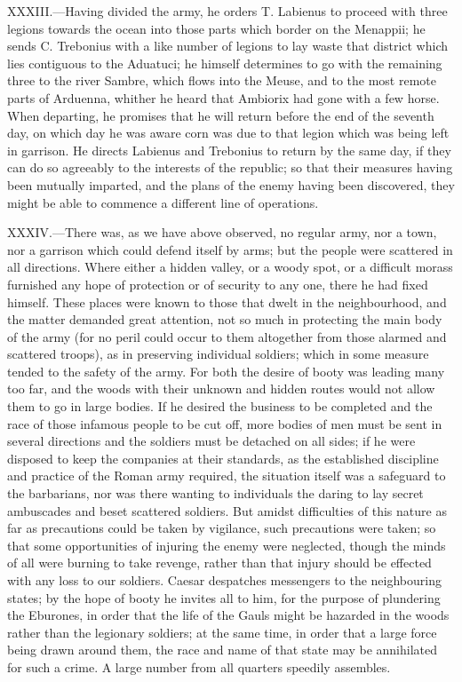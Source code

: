XXXIII.—Having divided the army, he orders T. Labienus to proceed with
three legions towards the ocean into those parts which border on the
Menappii; he sends C. Trebonius with a like number of legions to lay
waste that district which lies contiguous to the Aduatuci; he himself
determines to go with the remaining three to the river Sambre, which
flows into the Meuse, and to the most remote parts of Arduenna, whither
he heard that Ambiorix had gone with a few horse. When departing, he
promises that he will return before the end of the seventh day, on which
day he was aware corn was due to that legion which was being left in
garrison. He directs Labienus and Trebonius to return by the same day,
if they can do so agreeably to the interests of the republic; so that
their measures having been mutually imparted, and the plans of the enemy
having been discovered, they might be able to commence a different line
of operations.

XXXIV.—There was, as we have above observed, no regular army, nor a
town, nor a garrison which could defend itself by arms; but the people
were scattered in all directions. Where either a hidden valley, or a
woody spot, or a difficult morass furnished any hope of protection or of
security to any one, there he had fixed himself. These places were known
to those that dwelt in the neighbourhood, and the matter demanded great
attention, not so much in protecting the main body of the army (for no
peril could occur to them altogether from those alarmed and scattered
troops), as in preserving individual soldiers; which in some measure
tended to the safety of the army. For both the desire of booty was
leading many too far, and the woods with their unknown and hidden routes
would not allow them to go in large bodies. If he desired the business
to be completed and the race of those infamous people to be cut off,
more bodies of men must be sent in several directions and the soldiers
must be detached on all sides; if he were disposed to keep the companies
at their standards, as the established discipline and practice of the
Roman army required, the situation itself was a safeguard to the
barbarians, nor was there wanting to individuals the daring to lay
secret ambuscades and beset scattered soldiers. But amidst difficulties
of this nature as far as precautions could be taken by vigilance, such
precautions were taken; so that some opportunities of injuring the enemy
were neglected, though the minds of all were burning to take revenge,
rather than that injury should be effected with any loss to our
soldiers. Caesar despatches messengers to the neighbouring states; by
the hope of booty he invites all to him, for the purpose of plundering
the Eburones, in order that the life of the Gauls might be hazarded in
the woods rather than the legionary soldiers; at the same time, in order
that a large force being drawn around them, the race and name of that
state may be annihilated for such a crime. A large number from all
quarters speedily assembles.

